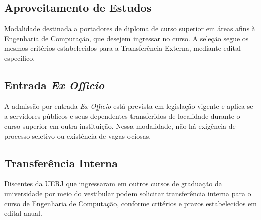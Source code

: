 \subsection{Aproveitamento de Estudos}
Modalidade destinada a portadores de diploma de curso superior em áreas afins à Engenharia de Computação, que desejem ingressar no curso. A seleção segue os mesmos critérios estabelecidos para a Transferência Externa, mediante edital específico.

\subsection{Entrada \textit{Ex Officio}}
A admissão por entrada \textit{Ex Officio} está prevista em legislação vigente e aplica-se a servidores públicos e seus dependentes transferidos de localidade durante o curso superior em outra instituição. Nessa modalidade, não há exigência de processo seletivo ou existência de vagas ociosas.

\subsection{Transferência Interna}
Discentes da UERJ que ingressaram em outros cursos de graduação da universidade por meio do vestibular podem solicitar transferência interna para o curso de Engenharia de Computação, conforme critérios e prazos estabelecidos em edital anual.





